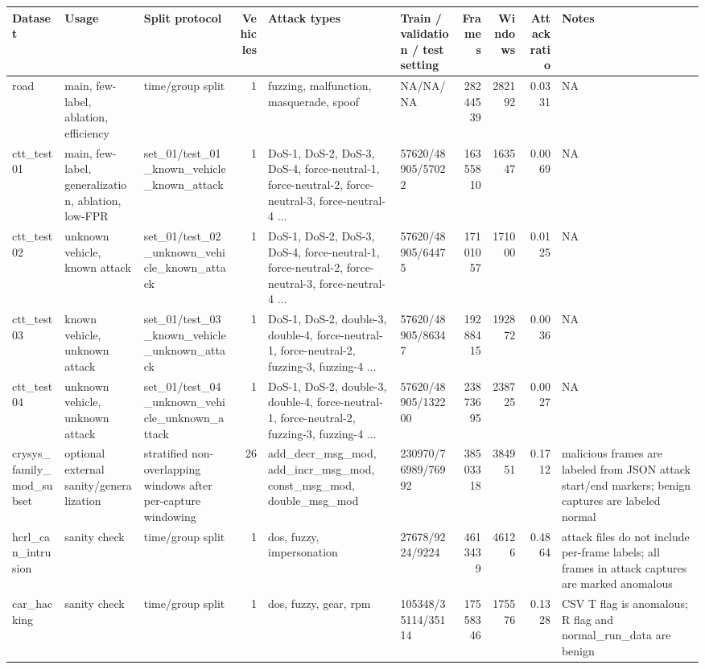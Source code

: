 \begin{tabular}{lllrllrrrl}
\toprule
Dataset & Usage & Split protocol & Vehicles & Attack types & Train / validation / test setting & Frames & Windows & Attack ratio & Notes \\
\midrule
road & main, few-label, ablation, efficiency & time/group split & 1 & fuzzing, malfunction, masquerade, spoof & NA/NA/NA & 28244539 & 282192 & 0.0331 & NA \\
ctt\_test01 & main, few-label, generalization, ablation, low-FPR & set\_01/test\_01\_known\_vehicle\_known\_attack & 1 & DoS-1, DoS-2, DoS-3, DoS-4, force-neutral-1, force-neutral-2, force-neutral-3, force-neutral-4 ... & 57620/48905/57022 & 16355810 & 163547 & 0.0069 & NA \\
ctt\_test02 & unknown vehicle, known attack & set\_01/test\_02\_unknown\_vehicle\_known\_attack & 1 & DoS-1, DoS-2, DoS-3, DoS-4, force-neutral-1, force-neutral-2, force-neutral-3, force-neutral-4 ... & 57620/48905/64475 & 17101057 & 171000 & 0.0125 & NA \\
ctt\_test03 & known vehicle, unknown attack & set\_01/test\_03\_known\_vehicle\_unknown\_attack & 1 & DoS-1, DoS-2, double-3, double-4, force-neutral-1, force-neutral-2, fuzzing-3, fuzzing-4 ... & 57620/48905/86347 & 19288415 & 192872 & 0.0036 & NA \\
ctt\_test04 & unknown vehicle, unknown attack & set\_01/test\_04\_unknown\_vehicle\_unknown\_attack & 1 & DoS-1, DoS-2, double-3, double-4, force-neutral-1, force-neutral-2, fuzzing-3, fuzzing-4 ... & 57620/48905/132200 & 23873695 & 238725 & 0.0027 & NA \\
crysys\_family\_mod\_subset & optional external sanity/generalization & stratified non-overlapping windows after per-capture windowing & 26 & add\_decr\_msg\_mod, add\_incr\_msg\_mod, const\_msg\_mod, double\_msg\_mod & 230970/76989/76992 & 38503318 & 384951 & 0.1712 & malicious frames are labeled from JSON attack start/end markers; benign captures are labeled normal \\
hcrl\_can\_intrusion & sanity check & time/group split & 1 & dos, fuzzy, impersonation & 27678/9224/9224 & 4613439 & 46126 & 0.4864 & attack files do not include per-frame labels; all frames in attack captures are marked anomalous \\
car\_hacking & sanity check & time/group split & 1 & dos, fuzzy, gear, rpm & 105348/35114/35114 & 17558346 & 175576 & 0.1328 & CSV T flag is anomalous; R flag and normal\_run\_data are benign \\
\bottomrule
\end{tabular}
